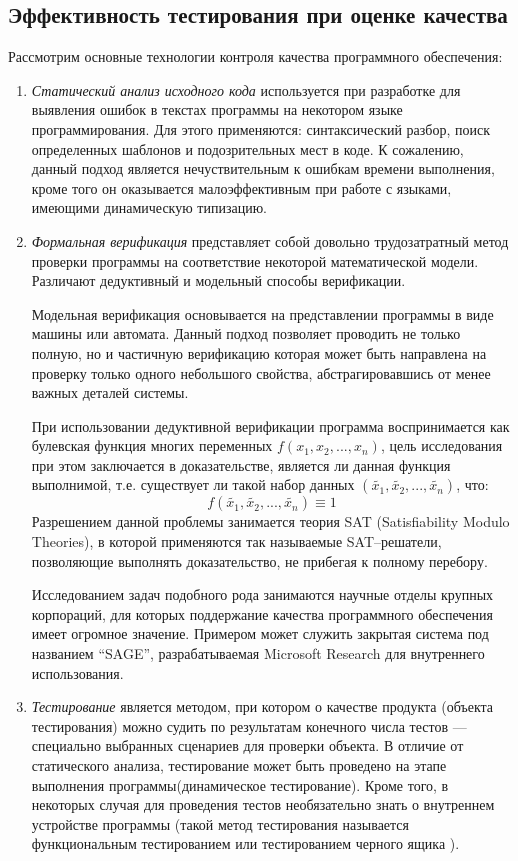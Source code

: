 \documentclass[a4paper,14pt,href]{article}
\begin{document}
\subsection{Эффективность тестирования при оценке качества} 
  Рассмотрим основные технологии контроля качества программного обеспечения:
\begin{enumerate}
\item 
	\textit{Статический анализ исходного кода} используется при разработке для выявления ошибок в текстах программы на некотором языке программирования. Для этого применяются: синтаксический разбор, поиск определенных шаблонов и подозрительных мест в коде. К сожалению, данный подход является нечуствительным к ошибкам времени выполнения, кроме того он оказывается малоэффективным при работе с языками, имеющими динамическую типизацию.
\item 
	\textit{Формальная верификация}	 представляет собой довольно трудозатратный метод проверки программы на соответствие некоторой математической модели. Различают дедуктивный и модельный способы верификации. 
	
	Модельная верификация основывается на представлении программы в виде машины или автомата. Данный подход позволяет проводить не только полную, но и частичную верификацию которая может быть направлена на проверку только одного небольшого свойства, абстрагировавшись от менее важных деталей системы\cite{OpenSystems}.
	
	При использовании дедуктивной верификации программа воспринимается как булевская функция многих переменных $f(x_1,x_2,...,x_n)$, цель исследования при этом заключается в доказательстве, является ли данная функция выполнимой, т.е. существует ли такой набор данных $(\tilde{x_1}, \tilde{x_2}, ..., \tilde{x_n})$, что:
	$$ f(\tilde{x_1}, \tilde{x_2}, ..., \tilde{x_n}) \equiv 1 $$
Разрешением данной проблемы занимается теория SAT (Satisfiability Modulo Theories), в которой применяются так называемые \linebreak SAT--решатели, позволяющие выполнять доказательство, не прибегая к полному перебору. 

 Исследованием задач подобного рода занимаются научные отделы крупных корпораций, для которых поддержание качества программного обеспечения имеет огромное значение. Примером может служить закрытая система под названием ``SAGE'', разрабатываемая Microsoft Research для внутреннего использования\cite{SAGE}.   
 
\item
	\textit{Тестирование} является методом, при котором о качестве продукта (объекта тестирования) можно судить по результатам конечного числа тестов --- специально выбранных сценариев для проверки объекта. В отличие от статического анализа, тестирование может быть проведено на этапе выполнения программы(динамическое тестирование). Кроме того, в некоторых случая для проведения тестов необязательно знать о внутреннем устройстве программы (такой метод тестирования называется функциональным тестированием или тестированием черного ящика\cite{TestingBlackBox} \cite{TestingComputerSoftware}).
\end{enumerate} 
  
\end{document}
